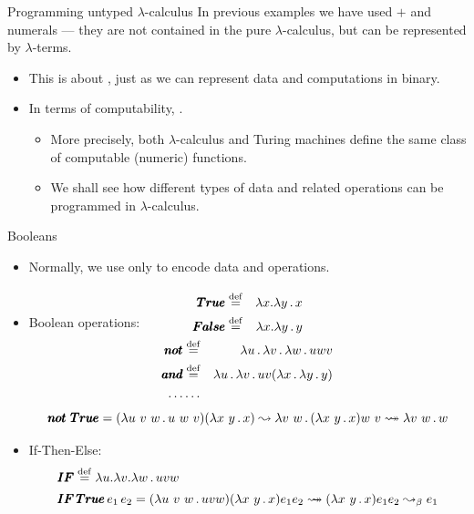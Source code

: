 \documentclass[paper=screen,mode=present,style=zysimple]{powerdot}
\begin{document}
\begin{slide}{Programming untyped $\lambda$-calculus}
In previous examples we have used $+$ and numerals ---  
  they are not contained in the pure $\lambda$-calculus, but can be represented by $\lambda$-terms.
\begin{itemize}
\item This is about , just as we can represent data and computations in binary.
\item In terms of computability, .
\begin{itemize}
\item More precisely, both $\lambda$-calculus and Turing machines define the same class of computable 
  (numeric) functions.
\item We shall see how different types of data and related operations can be programmed 
  in $\lambda$-calculus.
\end{itemize}
\end{itemize}
\end{slide}

\begin{slide}{Booleans}
\begin{itemize}
\item Normally, we use only  to encode data and operations.
\begin{eqnarray*}
\pmb{True} & \stackrel{\mathrm{def}}{=} & \lambda x . \lambda y \, . \, x  \\
\pmb{False} & \stackrel{\mathrm{def}}{=} & \lambda x . \lambda y \, . \, y
\\[-3.5em]
\end{eqnarray*}
\item Boolean operations: 
\begin{eqnarray*}
\pmb{not} & \stackrel{\mathrm{def}}{=} & \lambda u \, . \, \lambda v \, . \, \lambda w \, . \, u w v 
\\
\pmb{and} & \stackrel{\mathrm{def}}{=} & \lambda u \, . \, \lambda v \, . \, u v (\lambda x \, . \, \lambda y \, . \, y) 
\\
\ldots & \ldots &
\end{eqnarray*}
\vspace*{-1.5em} 
\[
\pmb{not} \ \pmb{True} = (\lambda u \ v \ w \ldot u \ w \ v) (\lambda x \ y \ldot x)
\reduce \lambda v \ w \ldot (\lambda x\ y \ldot x) w \ v 
\reduceto \lambda v \ w \ldot w
\vspace*{-2em}
\]
\item If-Then-Else: 
\[
\begin{array}{l}
\pmb{IF} \defeq \lambda u . \lambda v . \lambda w \ldot u v w
\\[0.5em]
\pmb{IF} \, \pmb{True} \, e_1 \, e_2 
= (\lambda u \ v \ w \ldot u v w) (\lambda x \ y \ldot x) e_1 e_2
\reduceto (\lambda x \ y \ldot x) e_1 e_2 \betareduce e_1
\end{array}
\]
\end{itemize}
\end{slide}
\end{document}
